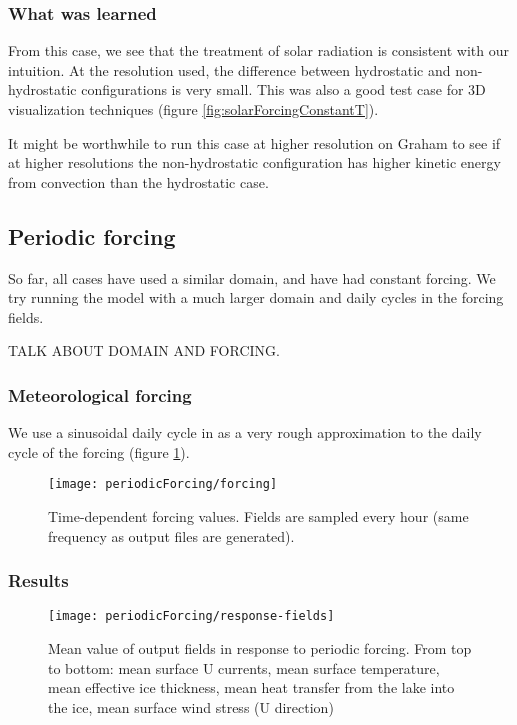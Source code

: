 \documentclass[11pt]{article}
\begin{document}
\subsubsection{What was learned}
From this case, we see that the treatment of solar radiation is consistent with our intuition. At the resolution used, the difference between hydrostatic and non-hydrostatic configurations is very small. This was also a good test case for 3D visualization techniques (figure \ref{fig:solarForcingConstantT}).

It might be worthwhile to run this case at higher resolution on Graham to see if at higher resolutions the non-hydrostatic configuration has higher kinetic energy from convection than the hydrostatic case.


\subsection{Periodic forcing}
So far, all cases have used a similar domain, and have had constant forcing. We try running the model with a much larger domain and daily cycles in the forcing fields.

TALK ABOUT DOMAIN AND FORCING.

\subsubsection*{Meteorological forcing}
We use a sinusoidal daily cycle in as a very rough approximation to the daily cycle of the forcing (figure \ref{fig:periodicForcingFields}).

\begin{figure}[h!]
\texttt{[image: periodicForcing/forcing]}
\caption{Time-dependent forcing values. Fields are sampled every hour (same frequency as output files are generated).}
\label{fig:periodicForcingFields}
\end{figure}

\subsubsection{Results}
\begin{figure}[h!]
\texttt{[image: periodicForcing/response-fields]}
\caption{Mean value of output fields in response to periodic forcing. From top to bottom: mean surface U currents, mean surface temperature, mean effective ice thickness, mean heat transfer from the lake into the ice, mean surface wind stress (U direction)}
\label{fig:periodicForcingResponse}
\end{figure}
\end{document}
